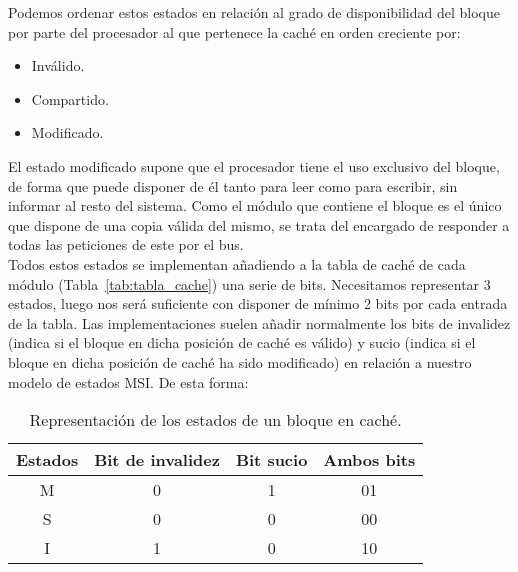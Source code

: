 Podemos ordenar estos estados en relación al grado de disponibilidad del bloque por parte del procesador al que pertenece la caché en orden creciente por:
\begin{itemize}
    \item Inválido.
    \item Compartido.
    \item Modificado.
\end{itemize}
El estado modificado supone que el procesador tiene el uso exclusivo del bloque, de forma que puede disponer de él tanto para leer como para escribir, sin informar al resto del sistema. Como el módulo que contiene el bloque es el único que dispone de una copia válida del mismo, se trata del encargado de responder a todas las peticiones de este por el bus.\\

Todos estos estados se implementan añadiendo a la tabla de caché de cada módulo (Tabla~\ref{tab:tabla_cache}) una serie de bits. Necesitamos representar 3 estados, luego nos será suficiente con disponer de mínimo 2 bits por cada entrada de la tabla. Las implementaciones suelen añadir normalmente los bits de invalidez (indica si el bloque en dicha posición de caché es válido) y sucio (indica si el bloque en dicha posición de caché ha sido modificado) en relación a nuestro modelo de estados MSI\@. De esta forma:
\begin{table}[H]
\centering
\begin{tabular}{c c c c}
    Estados & Bit de invalidez & Bit sucio & Ambos bits \\
    \midrule
    M & 0 & 1 & 01 \\
    S & 0 & 0 & 00 \\
    I & 1 & 0 & 10
\end{tabular}
\caption{Representación de los estados de un bloque en caché.}
\end{table}

